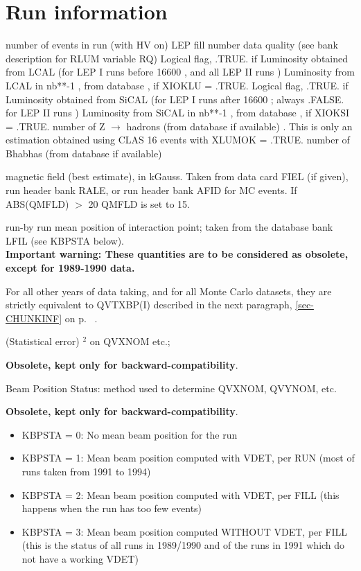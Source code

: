\section{\label{sec-MR}Run information}
\par
\begin{indentlist}{ 2.50cm}{ 2.75cm}
number of events in run (with HV on)
LEP fill number
data quality (see bank description for RLUM variable RQ)
Logical flag,  .TRUE. if Luminosity obtained from LCAL
(for LEP I runs before 16600 , and all LEP II runs )
Luminosity from LCAL in nb**-1 , from database , if XIOKLU = .TRUE.
Logical flag,  .TRUE. if Luminosity obtained from SiCAL
(for LEP I runs after 16600 ; always .FALSE. for LEP II runs )
Luminosity from SiCAL in nb**-1 , from database , if XIOKSI = .TRUE.
number of Z $\to$ hadrons  (from database if available) .
                    This is only an estimation obtained using CLAS 16 events with XLUMOK = .TRUE.
number of Bhabhas (from database if available)

magnetic field (best estimate), in kGauss. Taken from
data card FIEL (if given),
run header bank RALE, or run header bank AFID for MC events.
If ABS(QMFLD) $>$ 20 QMFLD is set to 15.

run-by run mean position of interaction
point;
taken from the database bank LFIL (see KBPSTA below).\\
{\bf Important warning: These quantities are to be considered as obsolete, except for 1989-1990 data.}

 For all other years of data taking, and for all Monte Carlo datasets, they are strictly equivalent to
 QVTXBP(I) described in the next paragraph, \ref{sec-CHUNKINF} on p. ~\pageref{sec-CHUNKINF}.

(Statistical error) $^2$ on QVXNOM
etc.;

 {\bf Obsolete, kept only for backward-compatibility}.

Beam Position Status: method used to determine
QVXNOM, QVYNOM, etc.

 {\bf Obsolete, kept only for backward-compatibility}.
\begin{itemize}
\item KBPSTA = 0:  No mean beam position for the run
\item  KBPSTA = 1:  Mean beam position computed with VDET, per RUN
(most of  runs taken from 1991 to 1994)
\item  KBPSTA = 2:  Mean beam position computed with VDET, per FILL
(this happens when the run has too few events)
\item  KBPSTA = 3:  Mean beam position computed WITHOUT VDET, per FILL
(this is the status of all runs in 1989/1990 and
of the runs in 1991 which do not have a working VDET)
\end{itemize}


\end{indentlist}

